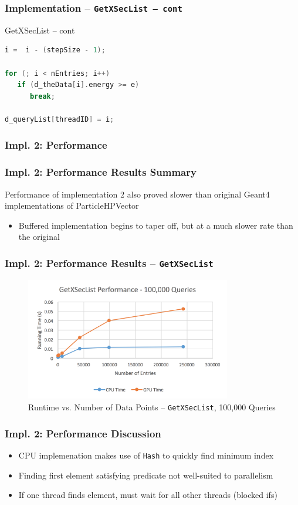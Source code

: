 \documentclass{beamer}
\begin{document}
\begin{frame}[fragile]
\frametitle{Implementation -- \texttt{GetXSecList -- cont}}
\begin{block}{GetXSecList -- cont}
\begin{lstlisting}[language=C++, basicstyle=\ttfamily, keywordstyle=\color{red}]
i =  i - (stepSize - 1); 

for (; i < nEntries; i++) 
   if (d_theData[i].energy >= e) 
      break;
   
d_queryList[threadID] = i;
\end{lstlisting}
\end{block}
\end{frame}


\subsubsection{Impl. 2: Performance}
\begin{frame}
\frametitle{Impl. 2: Performance Results Summary}
Performance of implementation 2 also proved slower than 
original Geant4 implementations of ParticleHPVector
\begin{itemize}
\item Buffered implementation begins to taper off, but at a 
much slower rate than the original
\end{itemize}
\end{frame}

\begin{frame}
\frametitle{Impl. 2: Performance Results -- \texttt{GetXSecList}}
\begin{figure}
\centering
\includegraphics[width=0.8\textwidth]{images/getxseclist_100000.png}
\caption{Runtime vs. Number of Data Points -- \texttt{GetXSecList}, 100,000 Queries}
\end{figure}
\end{frame}

\begin{frame}
\frametitle{Impl. 2: Performance Discussion}
\begin{itemize}
\item CPU implemenation makes use of \texttt{Hash} to quickly find minimum index
\item Finding first element satisfying predicate not well-suited to parallelism
\item If one thread finds element, must wait for all other threads (blocked ifs)
\end{itemize}
\end{frame}
\end{document}
